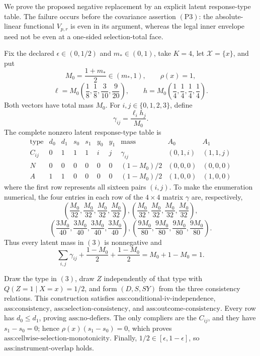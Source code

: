 We prove the proposed negative replacement by an explicit latent response-type table.  The failure occurs before the covariance assertion \((\mathrm{P3})\): the absolute-linear functional \(V_{p,r}\) is even in its argument, whereas the legal inner envelope need not be even at a one-sided selection-total face.

Fix the declared \(\epsilon\in(0,1/2)\) and \(m_*\in(0,1)\), take \(K=4\), let \(\mathcal X=\{x\}\), and put
\[
 M_0=\frac{1+m_*}{2}\in(m_*,1),\qquad \rho(x)=1,
\]
\[
 \ell=M_0\left(\frac18,\frac18,\frac3{10},\frac9{20}\right),
 \qquad
 h=M_0\left(\frac14,\frac14,\frac14,\frac14\right).
\tag{1}
\]
Both vectors have total mass \(M_0\).  For \(i,j\in\{0,1,2,3\}\), define
\[
 \gamma_{ij}=\frac{\ell_i h_j}{M_0}.
\tag{2}
\]
The complete nonzero latent response-type table is
\[
\begin{array}{c|cccccc|c|c|c}
\text{type}&d_0&d_1&s_0&s_1&y_0&y_1&\text{mass}&A_0&A_1\\ \hline
C_{ij}&0&1&1&1&i&j&\gamma_{ij}&(0,1,i)&(1,1,j)\\
N&0&0&0&0&0&0&(1-M_0)/2&(0,0,0)&(0,0,0)\\
A&1&1&0&0&0&0&(1-M_0)/2&(1,0,0)&(1,0,0)
\end{array}
\tag{3}
\]
where the first row represents all sixteen pairs \((i,j)\).  To make the enumeration numerical, the four entries in each row of the \(4\times4\) matrix \(\gamma\) are, respectively,
\[
 \left(\frac{M_0}{32},\frac{M_0}{32},\frac{M_0}{32},\frac{M_0}{32}\right),
 \left(\frac{M_0}{32},\frac{M_0}{32},\frac{M_0}{32},\frac{M_0}{32}\right),
\]
\[
 \left(\frac{3M_0}{40},\frac{3M_0}{40},\frac{3M_0}{40},\frac{3M_0}{40}\right),
 \left(\frac{9M_0}{80},\frac{9M_0}{80},\frac{9M_0}{80},\frac{9M_0}{80}\right).
\tag{4}
\]
Thus every latent mass in \((3)\) is nonnegative and
\[
 \sum_{i,j}\gamma_{ij}+\frac{1-M_0}{2}+\frac{1-M_0}{2}
 =M_0+1-M_0=1.
\tag{5}
\]

Draw the type in \((3)\), draw \(Z\) independently of that type with \(Q(Z=1\mid X=x)=1/2\), and form \((D,S,SY)\) from the three consistency relations.  This construction satisfies \(\text{ass:conditional-iv-independence}\), \(\text{ass:consistency}\), \(\text{ass:selection-consistency}\), and \(\text{ass:outcome-consistency}\).  Every row has \(d_0\le d_1\), proving \(\text{ass:no-defiers}\).  The only compliers are the \(C_{ij}\), and they have \(s_1-s_0=0\); hence \(\rho(x)(s_1-s_0)=0\), which proves \(\text{ass:cellwise-selection-monotonicity}\).  Finally, \(1/2\in[\epsilon,1-\epsilon]\), so \(\text{ass:instrument-overlap}\) holds.

